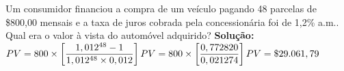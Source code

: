 \begin{example}
	Um consumidor financiou a compra de um veículo pagando 48 parcelas de \$800,00 mensais e a taxa de juros cobrada pela concessionária foi de 1,2\% a.m.. Qual era o valor à vista do automóvel adquirido?
	\newline
	\textbf{Solução:}
	\newline
	$PV = 800 \times \left[ \dfrac{1,012^{48}-1}{1,012^{48}\times 0,012} \right] \newline
		PV = 800 \times \left[ \dfrac{0,772820}{0,021274} \right] \newline
		PV = \$29.061,79$
\end{example}
